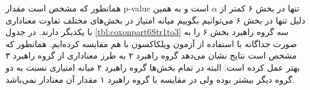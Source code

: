 \documentclass[twoside, a4paper,11pt]{book}
\numberwithin{equation}{chapter}
\numberwithin{table}{chapter}
\numberwithin{figure}{chapter}
\numberwithin{equation}{chapter}
\begin{document}
\begin{table}[]
\end{table}

همانطور که مشخص است مقدار p-value تنها در بخش ۶ کمتر از $\alpha$ است و به همین دلیل تنها در بخش ۶ می‌توانیم بگوییم میانه امتیاز در بخش‌های مختلف تفاوت معناداری با یکدیگر دارند. در جدول \ref{tbl:coxonpart6Str1to3} سه گروه راهبرد بخش ۶ را به صورت جداگانه با استفاده از آزمون ویلکاکسون با هم مقایسه کرده‌ایم. همانطور که مشخص است نتایج نشان می‌دهد گروه راهبرد ۲ به طرز معناداری از گروه راهبرد ۳ بهتر عمل کرده است. البته در تمام بخش‌ها گروه راهبرد ۲ میانه امتیازی نسبت به دو گروه دیگر بیشتر بوده ولی در مقایسه با گروه راهبرد ۱ مقدار آن معنادار نمی‌باشد.
\end{document}
